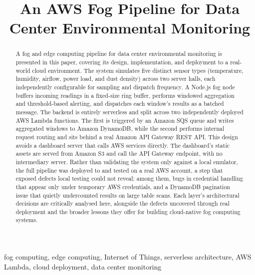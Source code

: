 \documentclass[conference]{IEEEtran}
\begin{document}
\title{An AWS Fog Pipeline for Data Center Environmental Monitoring}

\author{
}

\maketitle

\begin{abstract}
A fog and edge computing pipeline for data center environmental monitoring is presented in this paper, covering its design, implementation, and deployment to a real-world cloud environment. The system simulates five distinct sensor types (temperature, humidity, airflow, power load, and dust density) across two server halls, each independently configurable for sampling and dispatch frequency. A Node.js fog node buffers incoming readings in a fixed-size ring buffer, performs windowed aggregation and threshold-based alerting, and dispatches each window's results as a batched message. The backend is entirely serverless and split across two independently deployed AWS Lambda functions. The first is triggered by an Amazon SQS queue and writes aggregated windows to Amazon DynamoDB, while the second performs internal request routing and sits behind a real Amazon API Gateway REST API. This design avoids a dashboard server that calls AWS services directly. The dashboard's static assets are served from Amazon S3 and call the API Gateway endpoint, with no intermediary server. Rather than validating the system only against a local emulator, the full pipeline was deployed to and tested on a real AWS account, a step that exposed defects local testing could not reveal: among them, bugs in credential handling that appear only under temporary AWS credentials, and a DynamoDB pagination issue that quietly undercounted results on large table scans. Each layer's architectural decisions are critically analysed here, alongside the defects uncovered through real deployment and the broader lessons they offer for building cloud-native fog computing systems.
\end{abstract}

\begin{IEEEkeywords}
fog computing, edge computing, Internet of Things, serverless architecture, AWS Lambda, cloud deployment, data center monitoring
\end{IEEEkeywords}
\end{document}
